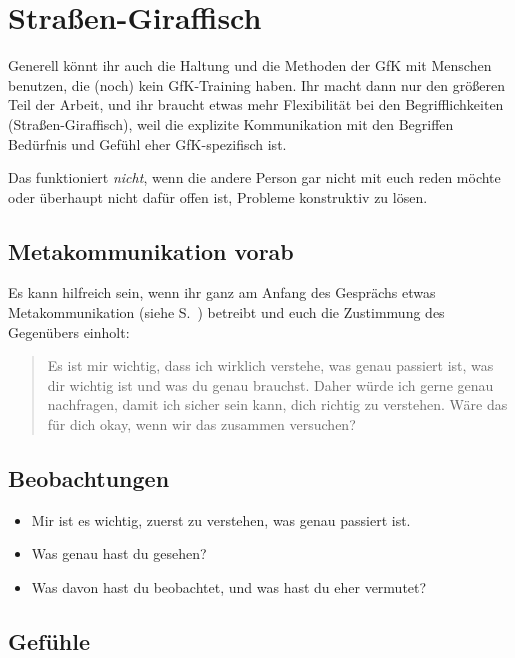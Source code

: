 \section{Straßen-Giraffisch}
\label{strassengiraffisch}

Generell könnt ihr auch die Haltung und die Methoden der GfK mit Menschen benutzen, die (noch) kein GfK-Training haben. Ihr macht dann nur den größeren Teil der Arbeit, und ihr braucht etwas mehr Flexibilität bei den Begrifflichkeiten (\glqq Straßen-Giraffisch\grqq), weil die explizite Kommunikation mit den Begriffen \glqq Bedürfnis\grqq{} und \glqq Gefühl\grqq{} eher GfK-spezifisch ist.

Das funktioniert \emph{nicht}, wenn die andere Person gar nicht mit euch reden möchte oder überhaupt nicht dafür offen ist, Probleme konstruktiv zu lösen.

\subsection{Metakommunikation vorab}

Es kann hilfreich sein, wenn ihr ganz am Anfang des Gesprächs etwas Metakommunikation (siehe S.~\pageref{metakommunikation}) betreibt und euch die Zustimmung des Gegenübers einholt:

\begin{quote}
    Es ist mir wichtig, dass ich wirklich verstehe, was genau passiert ist, was dir wichtig ist und was du genau brauchst. Daher würde ich gerne genau nachfragen, damit ich sicher sein kann, dich richtig zu verstehen. Wäre das für dich okay, wenn wir das zusammen versuchen?
\end{quote}

\subsection{Beobachtungen}

\begin{itemize}
    \item Mir ist es wichtig, zuerst zu verstehen, was genau passiert ist.
    \item Was genau hast du gesehen?
    \item Was davon hast du beobachtet, und was hast du eher vermutet?
\end{itemize}

\subsection{Gefühle}

